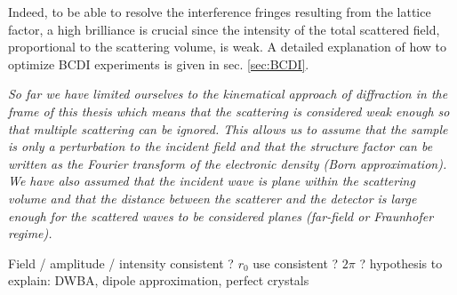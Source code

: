 Indeed, to be able to resolve the interference fringes resulting from the lattice factor, a high brilliance is crucial since the intensity of the total scattered field, proportional to the scattering volume, is weak.
A detailed explanation of how to optimize BCDI experiments is given in sec. \ref{sec:BCDI}.

\textit{
So far we have limited ourselves to the kinematical approach of diffraction in the frame of this thesis which means that the scattering is considered weak enough so that multiple scattering can be ignored.
This allows us to assume that the sample is only a perturbation to the incident field and that the structure factor can be written as the Fourier transform of the electronic density (Born approximation).
We have also assumed that the incident wave is plane within the scattering volume and that the distance between the scatterer and the detector is large enough for the scattered waves to be considered planes (far-field or Fraunhofer regime).
}

\textcolor{Important}{
Field / amplitude / intensity consistent ?
$r_0$ use consistent ? $2\pi$ ?
hypothesis to explain: DWBA, dipole approximation, perfect crystals
}

